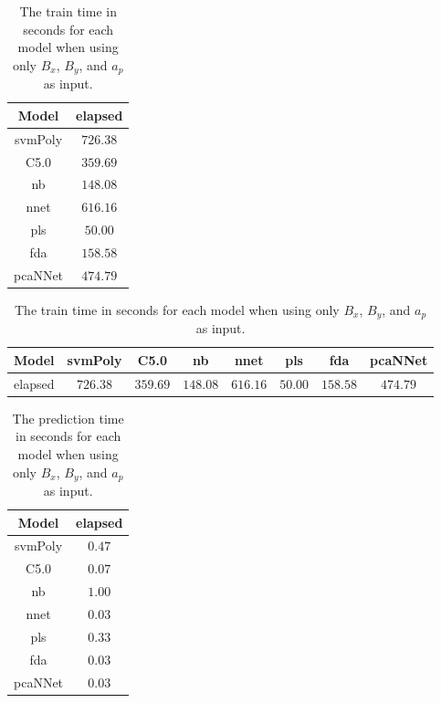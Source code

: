 \begin{table}[!ht]
	\centering
	\begin{tabular}{|c|c|}
		\hline
		Model & elapsed \\ \hline
		svmPoly & $726.38$ \\ \hline
		C5.0 & $359.69$ \\ \hline
		nb & $148.08$ \\ \hline
		nnet & $616.16$ \\ \hline
		pls & $50.00$ \\ \hline
		fda & $158.58$ \\ \hline
		pcaNNet & $474.79$ \\ \hline
	\end{tabular}
	\caption{The train time in seconds for each model when using only $B_{x}$, $B_{y}$, and $a_{p}$ as input.}
	\label{tab:time:xyap:train}
\end{table}

\begin{table}[!ht]
	\centering
	\begin{tabular}{|c|c|c|c|c|c|c|c|}
		\hline
		Model & svmPoly & C5.0 & nb & nnet & pls & fda & pcaNNet \\ \hline
		elapsed & $726.38$ & $359.69$ & $148.08$ & $616.16$ & $50.00$ & $158.58$ & $474.79$ \\ \hline
	\end{tabular}
	\caption{The train time in seconds for each model when using only $B_{x}$, $B_{y}$, and $a_{p}$ as input.}
	\label{tab:time:reverse:xyap:train}
\end{table}

\begin{table}[!ht]
	\centering
	\begin{tabular}{|c|c|}
		\hline
		Model & elapsed \\ \hline
		svmPoly & $0.47$ \\ \hline
		C5.0 & $0.07$ \\ \hline
		nb & $1.00$ \\ \hline
		nnet & $0.03$ \\ \hline
		pls & $0.33$ \\ \hline
		fda & $0.03$ \\ \hline
		pcaNNet & $0.03$ \\ \hline
	\end{tabular}
	\caption{The prediction time in seconds for each model when using only $B_{x}$, $B_{y}$, and $a_{p}$ as input.}
	\label{tab:time:xyap:predict}
\end{table}

